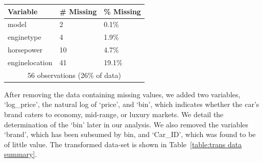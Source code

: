 \documentclass[a4paper, 10pt, titlepage]{article}
\begin{document}
\begin{table}[!ht]
	\centering
	\begin{tabular}{|l|l|l|}
		\hline
		\textbf{Variable} & \textbf{\# Missing} & \textbf{\% Missing}\\
		\hline
		model & 2 & 0.1\%\\
		enginetype & 4 & 1.9\%\\
		horsepower & 10 & 4.7\%\\
		enginelocation & 41 & 19.1\%\\
		\hline
		\multicolumn{3}{|c|}{56 observations (26\% of data)}\\
		\hline
	\end{tabular}
	\label{table:missing data}
\end{table}

After removing the data containing missing values, we added two variables, `log\_price', the natural log of `price', and `bin', which indicates whether the car's brand caters to economy, mid-range, or luxury markets. We detail the determination of the `bin' later in our analysis. We also removed the variables `brand', which has been subsumed by bin, and `Car\_ID', which was found to be of little value. The transformed data-set is shown in Table~\ref{table:trans data summary}.
\end{document}
